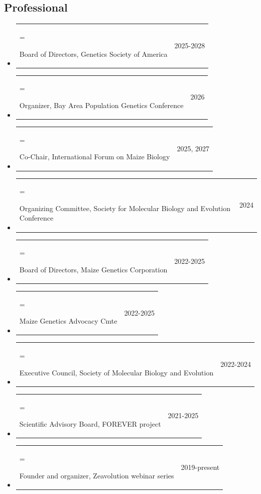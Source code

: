 \documentclass[letterpaper,10pt]{article}
\makeatletter
\newlength{\cvhang}\setlength{\cvhang}{1.5em}
\newcommand{\cvitem}[3][\cvhang]{%
  \item\begin{tabularx}{\dimexpr\linewidth+\cvhang\relax}{@{}>{\hangindent=#1\hangafter=1\raggedright\arraybackslash}X@{\hspace{1.5em}}r@{}}
    #2 & #3
  \end{tabularx}%
}
\makeatother
\begin{document}
\subsection*{Professional}
\begin{itemize}
\cvitem{Board of Directors, Genetics Society of America}{2025-2028}
\cvitem{Organizer, Bay Area Population Genetics Conference}{2026}
\cvitem{Co-Chair, International Forum on Maize Biology}{2025, 2027}
\cvitem{Organizing Committee, Society for Molecular Biology and Evolution Conference}{2024}
\cvitem{Board of Directors, Maize Genetics Corporation}{2022-2025}
\cvitem{Maize Genetics Advocacy Cmte}{2022-2025}
\cvitem{Executive Council, Society of Molecular Biology and Evolution}{2022-2024}
\cvitem{Scientific Advisory Board, FOREVER project}{2021-2025}%
\cvitem{Founder and organizer, Zeavolution webinar series}{2019-present}

\end{itemize}
\end{document}
